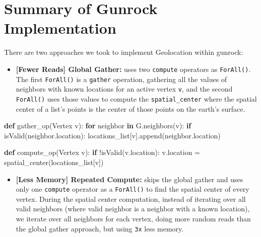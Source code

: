 \documentclass[10pt,oneside]{memoir}
\newenvironment{Shaded}{}{}
\newcommand{\ControlFlowTok}[1]{\textcolor[rgb]{0.00,0.44,0.13}{\textbf{#1}}}
\newcommand{\KeywordTok}[1]{\textcolor[rgb]{0.00,0.44,0.13}{\textbf{#1}}}
\newcommand{\NormalTok}[1]{#1}
\newcommand{\OperatorTok}[1]{\textcolor[rgb]{0.40,0.40,0.40}{#1}}
\providecommand{\tightlist}{%
  \setlength{\itemsep}{0pt}\setlength{\parskip}{0pt}}
\begin{document}
\hypertarget{summary-of-gunrock-implementation}{%
\section{Summary of Gunrock
Implementation}\label{summary-of-gunrock-implementation}}

There are two approaches we took to implement Geolocation within
gunrock:

\begin{itemize}
\tightlist
\item
  \textbf{{[}Fewer Reads{]} Global Gather:} uses two \texttt{compute}
  operators as \texttt{ForAll()}. The first \texttt{ForAll()} is a
  \texttt{gather} operation, gathering all the values of neighbors with
  known locations for an active vertex \texttt{v}, and the second
  \texttt{ForAll()} uses those values to compute the
  \texttt{spatial\_center} where the spatial center of a list's points
  is the center of those points on the earth's surface.
\end{itemize}

\begin{Shaded}
\begin{Highlighting}[]
\KeywordTok{def}\NormalTok{ gather_op(Vertex v):}
    \ControlFlowTok{for}\NormalTok{ neighbor }\KeywordTok{in}\NormalTok{ G.neighbors(v):}
        \ControlFlowTok{if}\NormalTok{ isValid(neighbor.location):}
\NormalTok{            locations_list[v].append(neighbor.location)}

\KeywordTok{def}\NormalTok{ compute_op(Vertex v):}
    \ControlFlowTok{if} \OperatorTok{!}\NormalTok{isValid(v.location):}
\NormalTok{        v.location }\OperatorTok{=}\NormalTok{ spatial_center(locations_list[v])}
\end{Highlighting}
\end{Shaded}

\begin{itemize}
\tightlist
\item
  \textbf{{[}Less Memory{]} Repeated Compute:} skips the global gather
  and uses only one \texttt{compute} operator as a \texttt{ForAll()} to
  find the spatial center of every vertex. During the spatial center
  computation, instead of iterating over all valid neighbors (where
  valid neighbor is a neighbor with a known location), we iterate over
  all neighbors for each vertex, doing more random reads than the global
  gather approach, but using \texttt{3x} less memory.
\end{itemize}
\end{document}
